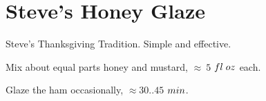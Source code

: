\section[Steve's Honey Glaze]{Steve's Honey Glaze}

\begin{recipestats}[
        preptime=5~\minute,
        original=Steven Teresi,
    ]
\end{recipestats}

\begin{recipeabstract}
    Steve's Thanksgiving Tradition.
    Simple and effective.
\end{recipeabstract}

\begin{ingredientcolumns}
    \begin{ingredientblock}
    \end{ingredientblock}
    \begin{ingredientblock}
    \end{ingredientblock}
\end{ingredientcolumns}

\begin{preparation}
\item Mix about equal parts honey and mustard, $\approx~5$ $\fluidounce$ each.
\item Glaze the ham occasionally, $\approx30..45$ $\minute$.
\end{preparation}

\recipeend%
